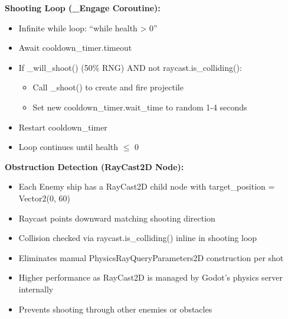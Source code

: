\documentclass{article}
\begin{document}
\textbf{Shooting Loop (\_Engage Coroutine):}
\begin{itemize}
    \item Infinite while loop: ``while health > 0''
    \item Await cooldown\_timer.timeout
    \item If \_will\_shoot() (50\% RNG) AND not raycast.is\_colliding():
    \begin{itemize}
        \item Call \_shoot() to create and fire projectile
        \item Set new cooldown\_timer.wait\_time to random 1-4 seconds
    \end{itemize}
    \item Restart cooldown\_timer
    \item Loop continues until health $\leq$ 0
\end{itemize}

\textbf{Obstruction Detection (RayCast2D Node):}
\begin{itemize}
    \item Each Enemy ship has a RayCast2D child node with target\_position = Vector2(0, 60)
    \item Raycast points downward matching shooting direction
    \item Collision checked via raycast.is\_colliding() inline in shooting loop
    \item Eliminates manual PhysicsRayQueryParameters2D construction per shot
    \item Higher performance as RayCast2D is managed by Godot's physics server internally
    \item Prevents shooting through other enemies or obstacles
\end{itemize}
\end{document}
